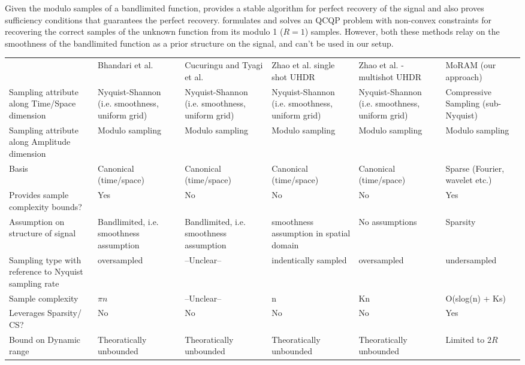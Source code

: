 Given the modulo samples of a bandlimited function, \cite{Bhandari} provides a stable algorithm for perfect recovery of the signal and also proves sufficiency conditions that guarantees the perfect recovery. \cite{Cucuringu2017} formulates and solves an QCQP problem with non-convex constraints for recovering the correct samples of the unknown function from its modulo 1 ($R =1$) samples. However, both these methods relay on the smoothness of the bandlimited function as a prior structure on the signal, and can't be used in our setup.

\begin{table*}[t]
	\begin{tabular}{p{2.5cm}|p{2.5cm}|p{2.5cm}|p{2.5cm}|p{2.5cm}|p{2.5cm}}
		\cline{1-6}
		& Bhandari et al.~\cite{Bhandari}  & Cucuringu and Tyagi et al.~\cite{Cucuringu2018} &Zhao et al. single shot UHDR \cite{ICCP15_Zhao}    & Zhao et al. - multishot UHDR~\cite{ICCP15_Zhao}  & MoRAM (our approach) \\ \cline{1-6}
		Sampling attribute along Time/Space dimension & Nyquist-Shannon (i.e. smoothness, uniform grid) & Nyquist-Shannon (i.e. smoothness, uniform grid) &Nyquist-Shannon (i.e. smoothness, uniform grid)& Nyquist-Shannon (i.e. smoothness, uniform grid) & Compressive Sampling (sub-Nyquist) \\ \cline{1-6}
		Sampling attribute along Amplitude dimension   & Modulo sampling        & Modulo sampling  & Modulo sampling   & Modulo sampling   & Modulo sampling   \\ \cline{1-6}
		Basis   & Canonical (time/space)     & Canonical (time/space)   & Canonical (time/space) & Canonical (time/space)  & Sparse (Fourier, wavelet etc.)  \\ \cline{1-6}
		Provides sample complexity bounds?  & Yes  & No  & No   & No & Yes \\ \cline{1-6}
		Assumption on structure of signal  & Bandlimited, i.e. smoothness assumption   & Bandlimited, i.e. smoothness assumption & smoothness assumption in spatial domain   & No assumptions      & Sparsity     \\ \cline{1-6}
		Sampling type with reference to Nyquist sampling rate  & oversampled   & --Unclear--   & indentically sampled  & oversampled   & undersampled  \\ \cline{1-6}
		Sample complexity  & $\pi n$    & --Unclear--     & n   & Kn   & O(slog(n) + Ks) \\ \cline{1-6}
		Leverages Sparsity/ CS?  & No & No  & No  & No    & Yes \\ \cline{1-6}
		Bound on Dynamic range   & Theoratically unbounded   & Theoratically unbounded  & Theoratically unbounded   & Theoratically unbounded   & Limited to $2R$  \\ \cline{1-6}                 
	\end{tabular}
\end{table*}

